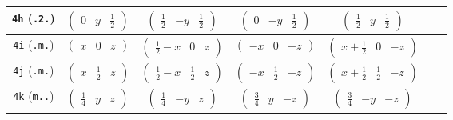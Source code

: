 \documentclass[fleqn,9pt,landscape]{jsarticle}
\begin{document}
\begin{center}
\begin{longtable}{ccccccc}
{\tt 4h} ({\tt .2.}) & $ \begin{pmatrix} 0 & y & \frac{1}{2} \end{pmatrix} $ & $ \begin{pmatrix} \frac{1}{2} & - y & \frac{1}{2} \end{pmatrix} $ & $ \begin{pmatrix} 0 & - y & \frac{1}{2} \end{pmatrix} $ & $ \begin{pmatrix} \frac{1}{2} & y & \frac{1}{2} \end{pmatrix} $ & $  $ & $  $ \\ \hline
{\tt 4i} ({\tt .m.}) & $ \begin{pmatrix} x & 0 & z \end{pmatrix} $ & $ \begin{pmatrix} \frac{1}{2} - x & 0 & z \end{pmatrix} $ & $ \begin{pmatrix} - x & 0 & - z \end{pmatrix} $ & $ \begin{pmatrix} x + \frac{1}{2} & 0 & - z \end{pmatrix} $ & $  $ & $  $ \\ \hline
{\tt 4j} ({\tt .m.}) & $ \begin{pmatrix} x & \frac{1}{2} & z \end{pmatrix} $ & $ \begin{pmatrix} \frac{1}{2} - x & \frac{1}{2} & z \end{pmatrix} $ & $ \begin{pmatrix} - x & \frac{1}{2} & - z \end{pmatrix} $ & $ \begin{pmatrix} x + \frac{1}{2} & \frac{1}{2} & - z \end{pmatrix} $ & $  $ & $  $ \\ \hline
{\tt 4k} ({\tt m..}) & $ \begin{pmatrix} \frac{1}{4} & y & z \end{pmatrix} $ & $ \begin{pmatrix} \frac{1}{4} & - y & z \end{pmatrix} $ & $ \begin{pmatrix} \frac{3}{4} & y & - z \end{pmatrix} $ & $ \begin{pmatrix} \frac{3}{4} & - y & - z \end{pmatrix} $ & $  $ & $  $ \\ \hline

\end{longtable}
\end{center}
\end{document}
